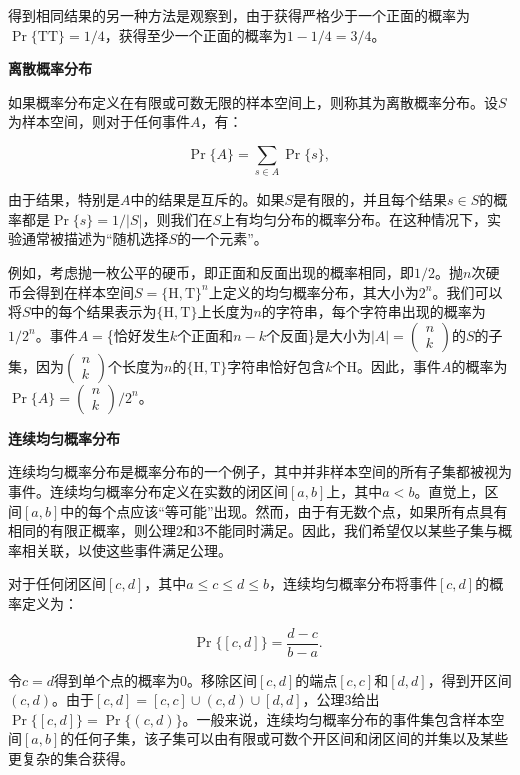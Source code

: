 \documentclass[lang=cn,newtx,10pt,scheme=chinese]{elegantbook}
\begin{document}
得到相同结果的另一种方法是观察到，由于获得严格少于一个正面的概率为$\operatorname{Pr}\{\mathrm{TT}\}=1/4$，获得至少一个正面的概率为$1-1/4=3/4$。

\textbf{离散概率分布}

如果概率分布定义在有限或可数无限的样本空间上，则称其为离散概率分布。设$S$为样本空间，则对于任何事件$A$，有：

$$
\operatorname{Pr}\{A\}=\sum_{s \in A} \operatorname{Pr}\{s\} \text {, }
$$

由于结果，特别是$A$中的结果是互斥的。如果$S$是有限的，并且每个结果$s \in S$的概率都是$\operatorname{Pr}\{s\}=1/|S|$，则我们在$S$上有均匀分布的概率分布。在这种情况下，实验通常被描述为“随机选择$S$的一个元素”。

例如，考虑抛一枚公平的硬币，即正面和反面出现的概率相同，即$1/2$。抛$n$次硬币会得到在样本空间$S=\{\mathrm{H}, \mathrm{T}\}^n$上定义的均匀概率分布，其大小为$2^n$。我们可以将$S$中的每个结果表示为$\{\mathrm{H}, \mathrm{T}\}$上长度为$n$的字符串，每个字符串出现的概率为$1/2^n$。事件$A=$\{恰好发生$k$个正面和$n-k$个反面\}是大小为$|A|=\left(\begin{array}{l}n \\ k\end{array}\right)$的$S$的子集，因为$\left(\begin{array}{l}n \\ k\end{array}\right)$个长度为$n$的$\{\mathrm{H}, \mathrm{T}\}$字符串恰好包含$k$个H。因此，事件$A$的概率为$\operatorname{Pr}\{A\}=\left(\begin{array}{l}n \\ k\end{array}\right)/2^n$。

\textbf{连续均匀概率分布}

连续均匀概率分布是概率分布的一个例子，其中并非样本空间的所有子集都被视为事件。连续均匀概率分布定义在实数的闭区间$[a, b]$上，其中$a<b$。直觉上，区间$[a, b]$中的每个点应该“等可能”出现。然而，由于有无数个点，如果所有点具有相同的有限正概率，则公理2和3不能同时满足。因此，我们希望仅以某些子集与概率相关联，以使这些事件满足公理。

对于任何闭区间$[c, d]$，其中$a \leq c \leq d \leq b$，连续均匀概率分布将事件$[c, d]$的概率定义为：

$$
\operatorname{Pr}\{[c, d]\}=\frac{d-c}{b-a} \text {. }
$$

令$c=d$得到单个点的概率为0。移除区间$[c, d]$的端点$[c, c]$和$[d, d]$，得到开区间$(c, d)$。由于$[c, d]=[c, c] \cup(c, d) \cup[d, d]$，公理3给出$\operatorname{Pr}\{[c, d]\}=\operatorname{Pr}\{(c, d)\}$。一般来说，连续均匀概率分布的事件集包含样本空间$[a, b]$的任何子集，该子集可以由有限或可数个开区间和闭区间的并集以及某些更复杂的集合获得。
\end{document}
